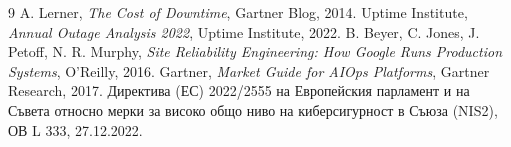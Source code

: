 \documentclass[11pt,a4paper]{article}
\begin{document}
\begin{thebibliography}{9}\footnotesize
\setlength{\itemsep}{0pt}
 A. Lerner, \emph{The Cost of Downtime}, Gartner Blog, 2014.
 Uptime Institute, \emph{Annual Outage Analysis 2022}, Uptime Institute, 2022.
 B. Beyer, C. Jones, J. Petoff, N. R. Murphy, \emph{Site Reliability Engineering: How Google Runs Production Systems}, O'Reilly, 2016.
 Gartner, \emph{Market Guide for AIOps Platforms}, Gartner Research, 2017.
 Директива (ЕС) 2022/2555 на Европейския парламент и на Съвета относно мерки за високо общо ниво на киберсигурност в Съюза (NIS2), ОВ L 333, 27.12.2022.
\end{thebibliography}
\end{document}
